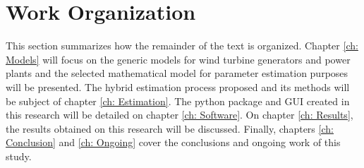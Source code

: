 \section{Work Organization}

This section summarizes how the remainder of the text is organized. Chapter \ref{ch: Models} will focus on the generic models for wind turbine generators and power plants and the selected mathematical model for parameter estimation purposes will be presented. The hybrid estimation process proposed and its methods will be subject of chapter \ref{ch: Estimation}. The python package and GUI created in this research will be detailed on chapter \ref{ch: Software}. On chapter \ref{ch: Results}, the results obtained on this research will be discussed. Finally, chapters \ref{ch: Conclusion} and \ref{ch: Ongoing} cover the conclusions and ongoing work of this study.